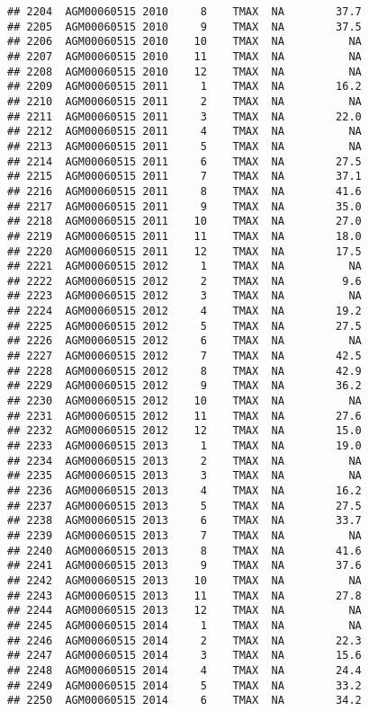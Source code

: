 \documentclass{article}\usepackage[]{graphicx}\usepackage[]{color}
\makeatletter
\newenvironment{kframe}{%
 \def\at@end@of@kframe{}%
 \ifinner\ifhmode%
  \def\at@end@of@kframe{\end{minipage}}%
  \begin{minipage}{\columnwidth}%
 \fi\fi%
 \def\FrameCommand##1{\hskip\@totalleftmargin \hskip-\fboxsep
 \colorbox{shadecolor}{##1}\hskip-\fboxsep
     \hskip-\linewidth \hskip-\@totalleftmargin \hskip\columnwidth}%
 \MakeFramed {\advance\hsize-\width
   \@totalleftmargin\z@ \linewidth\hsize
   \@setminipage}}%
 {\par\unskip\endMakeFramed%
 \at@end@of@kframe}
\newenvironment{knitrout}{}{} %
\makeatother
\begin{document}
\begin{knitrout}
\begin{kframe}
\begin{verbatim}
## 2204  AGM00060515 2010     8    TMAX  NA        37.7
## 2205  AGM00060515 2010     9    TMAX  NA        37.5
## 2206  AGM00060515 2010    10    TMAX  NA          NA
## 2207  AGM00060515 2010    11    TMAX  NA          NA
## 2208  AGM00060515 2010    12    TMAX  NA          NA
## 2209  AGM00060515 2011     1    TMAX  NA        16.2
## 2210  AGM00060515 2011     2    TMAX  NA          NA
## 2211  AGM00060515 2011     3    TMAX  NA        22.0
## 2212  AGM00060515 2011     4    TMAX  NA          NA
## 2213  AGM00060515 2011     5    TMAX  NA          NA
## 2214  AGM00060515 2011     6    TMAX  NA        27.5
## 2215  AGM00060515 2011     7    TMAX  NA        37.1
## 2216  AGM00060515 2011     8    TMAX  NA        41.6
## 2217  AGM00060515 2011     9    TMAX  NA        35.0
## 2218  AGM00060515 2011    10    TMAX  NA        27.0
## 2219  AGM00060515 2011    11    TMAX  NA        18.0
## 2220  AGM00060515 2011    12    TMAX  NA        17.5
## 2221  AGM00060515 2012     1    TMAX  NA          NA
## 2222  AGM00060515 2012     2    TMAX  NA         9.6
## 2223  AGM00060515 2012     3    TMAX  NA          NA
## 2224  AGM00060515 2012     4    TMAX  NA        19.2
## 2225  AGM00060515 2012     5    TMAX  NA        27.5
## 2226  AGM00060515 2012     6    TMAX  NA          NA
## 2227  AGM00060515 2012     7    TMAX  NA        42.5
## 2228  AGM00060515 2012     8    TMAX  NA        42.9
## 2229  AGM00060515 2012     9    TMAX  NA        36.2
## 2230  AGM00060515 2012    10    TMAX  NA          NA
## 2231  AGM00060515 2012    11    TMAX  NA        27.6
## 2232  AGM00060515 2012    12    TMAX  NA        15.0
## 2233  AGM00060515 2013     1    TMAX  NA        19.0
## 2234  AGM00060515 2013     2    TMAX  NA          NA
## 2235  AGM00060515 2013     3    TMAX  NA          NA
## 2236  AGM00060515 2013     4    TMAX  NA        16.2
## 2237  AGM00060515 2013     5    TMAX  NA        27.5
## 2238  AGM00060515 2013     6    TMAX  NA        33.7
## 2239  AGM00060515 2013     7    TMAX  NA          NA
## 2240  AGM00060515 2013     8    TMAX  NA        41.6
## 2241  AGM00060515 2013     9    TMAX  NA        37.6
## 2242  AGM00060515 2013    10    TMAX  NA          NA
## 2243  AGM00060515 2013    11    TMAX  NA        27.8
## 2244  AGM00060515 2013    12    TMAX  NA          NA
## 2245  AGM00060515 2014     1    TMAX  NA          NA
## 2246  AGM00060515 2014     2    TMAX  NA        22.3
## 2247  AGM00060515 2014     3    TMAX  NA        15.6
## 2248  AGM00060515 2014     4    TMAX  NA        24.4
## 2249  AGM00060515 2014     5    TMAX  NA        33.2
## 2250  AGM00060515 2014     6    TMAX  NA        34.2

\end{verbatim}
\end{kframe}
\end{knitrout}
\end{document}
